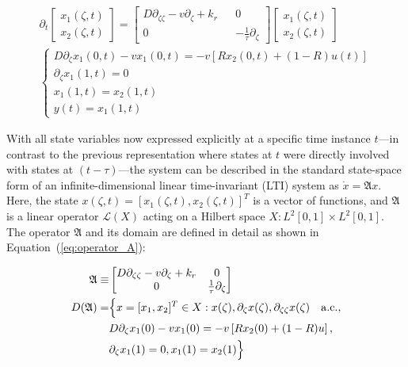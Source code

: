 \begin{align}
    \partial_t 
    \begin{bmatrix}
        x_1(\zeta, t) \\ x_2(\zeta,t)
    \end{bmatrix}
    =
    \begin{bmatrix}
        D \partial_{\zeta \zeta} - v \partial_\zeta + k_r && 0 \\
        0 && -\frac{1}{\tau} \partial_\zeta
    \end{bmatrix}
    \begin{bmatrix}
        x_1(\zeta, t) \\ x_2(\zeta,t)
    \end{bmatrix}\\
\begin{cases}
    D \partial_\zeta x_1(0, t) - v x_1(0, t) = -v \left[ R x_2(0, t) + (1-R) u(t) \right] \\
    \partial_\zeta x_1(1, t) = 0 \\
    x_1(1,t) = x_2(1,t) \\
    y(t) = x_1(1, t)
\end{cases}
\end{align}

With all state variables now expressed explicitly at a specific time instance $t$—in contrast to the previous representation where states at $t$ were directly involved with states at $(t-\tau)$—the system can be described in the standard state-space form of an infinite-dimensional linear time-invariant (LTI) system as $\dot{x} = \mathfrak{A} x$. Here, the state $x(\zeta, t) = [x_1(\zeta, t), x_2(\zeta, t)]^T$ is a vector of functions, and $\mathfrak{A}$ is a linear operator $\mathcal{L}(X)$ acting on a Hilbert space $X: L^2[0,1] \times L^2[0,1]$. The operator $\mathfrak{A}$ and its domain are defined in detail as shown in Equation~(\ref{eq:operator_A}):

\begin{equation} \label{eq:operator_A}
    \begin{aligned}
        \mathfrak{A} \equiv&
        \begin{bmatrix}
            D \partial_{\zeta \zeta} - v \partial_\zeta + k_r & 0 \\
            0 & \frac{1}{\tau} \partial_\zeta
        \end{bmatrix}\\
        D(\mathfrak{A}) =& \Bigl\{ x = [x_1, x_2]^T \in X:
        x(\zeta), \partial_\zeta x(\zeta), \partial_{\zeta \zeta} x(\zeta) \quad \mathrm{a.c.},\\
        &D \partial_\zeta x_1(0) - v x_1(0) = -v \left[ R x_2(0) + (1-R) u \right],\\
        &\partial_\zeta x_1(1) = 0,
        x_1(1) = x_2(1) \Bigr\}
    \end{aligned}
\end{equation}

